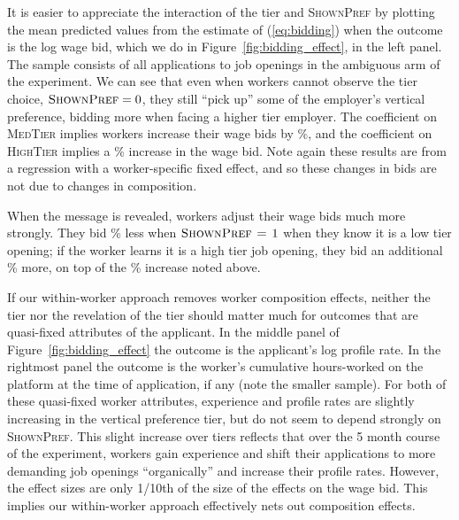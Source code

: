 \documentclass[12pt]{article}
\begin{document}
It is easier to appreciate the interaction of the tier and \textsc{ShownPref} by plotting the mean predicted values from the estimate of (\ref{eq:bidding}) when the outcome is the log wage bid, which we do in Figure~\ref{fig:bidding_effect}, in the left panel. 
The sample consists of all applications to job openings in the ambiguous arm of the experiment. 
We can see that even when workers cannot observe the tier choice, \mbox{$\textsc{ShownPref} = 0$}, they still ``pick up'' some of the employer's vertical preference, 
bidding more when facing a higher tier employer.
The coefficient on \textsc{MedTier} implies workers increase their wage bids by \BidIncreaseMedWorkerFE{}\%, and the coefficient on \textsc{HighTier} implies a \BidIncreaseHighWorkerFE{}\% increase in the wage bid.
Note again these results are from a regression with a worker-specific fixed effect, and so these changes in bids are not due to changes in composition.

When the message is revealed, workers adjust their wage bids much more strongly.
They bid \BidChangeLowRevealedWorkerFE{}\% less when $\textsc{ShownPref = 1}$ when they know it is a low tier opening; if the worker learns it is a high tier job opening, they bid an additional \BidChangeHighRevealedWorkerFE{}\% more, on top of the \BidIncreaseHighWorkerFE{}\% increase noted above.

If our within-worker approach removes worker composition effects, neither the tier nor the revelation of the tier should matter much for outcomes that are quasi-fixed attributes of the applicant.
In the middle panel of Figure~\ref{fig:bidding_effect} the outcome is the applicant's log profile rate. 
In the rightmost panel the outcome is the worker's cumulative hours-worked on the platform at the time of application, if any (note the smaller sample).
For both of these quasi-fixed worker attributes, experience and profile rates are slightly increasing in the vertical preference tier, but do not seem to depend strongly on \textsc{ShownPref}. 
This slight increase over tiers reflects that over the 5 month course of the experiment, workers gain experience and shift their applications to more demanding job openings ``organically'' and increase their profile rates.
However, the effect sizes are only 1/10th of the size of the effects on the wage bid.
This implies our within-worker approach effectively nets out composition effects. 
\end{document}
